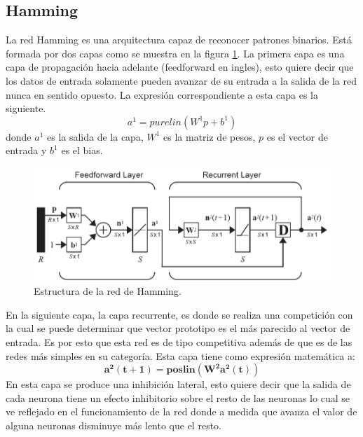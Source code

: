 \documentclass[12pt, titlepage]{article}
\begin{document}
        \subsection{Hamming}
        La red Hamming es una arquitectura capaz de reconocer patrones binarios. Está formada por dos capas como se muestra en la figura \ref{fig:hamming-diagrama}. La primera capa es una capa de propagación hacia adelante (feedforward en ingles), esto quiere decir que los datos de entrada solamente pueden avanzar de su entrada a la salida de la red nunca en sentido opuesto.
        La expresión correspondiente a esta capa es la siguiente.
        \[ a^1=purelin(W^1p+b^1) \]
        donde $a^1$ es la salida de la capa, $W^1$ es la matriz de pesos, $p$ es el vector de entrada y $b^1$ es el bias.
        \begin{figure}[H]
            \begin{center}
                \includegraphics[width=16cm]{img/hamming/diagrama.png}
                \caption{Estructura de la red de Hamming. \cite{libro1}}
                \label{fig:hamming-diagrama}
            \end{center}
        \end{figure}
        En la siguiente capa, la capa recurrente, es donde se realiza una competición con la cual se puede determinar que vector prototipo es el más parecido al vector de entrada.\cite{libro1}
        Es por esto que esta red es de tipo competitiva además de que es de las redes más simples en su categoría.
        Esta capa tiene como expresión matemática a:
        \[\boldsymbol{a^2(t+1) = poslin(W^2a^2(t))}\]
        En esta capa se produce una inhibición lateral, esto quiere decir que la salida de cada neurona tiene un efecto inhibitorio sobre el resto de las neuronas lo cual se ve reflejado en el funcionamiento de la red donde a medida que avanza el valor de alguna neuronas disminuye más lento que el resto. \cite{libro1} 
        
\end{document}
